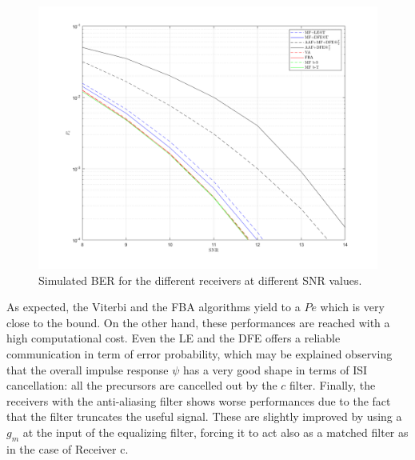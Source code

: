 \documentclass[a4paper, 12pt]{report}
\begin{document}
\begin{figure}[H]
	\centering
	\includegraphics[width=15cm]{images/PevsGamma}
	\caption{Simulated BER for the different receivers at different SNR values.}\label{Pe}
\end{figure}

As expected, the Viterbi and the FBA algorithms yield to a $Pe$ which is very close to the bound. On the other hand, these performances are reached with a high computational cost. Even the LE and the DFE offers a reliable communication in term of error probability, which may be explained observing that the overall impulse response $\psi$ has a very good shape in terms of ISI cancellation: all the precursors are cancelled out by the $c$ filter. Finally, the receivers with the anti-aliasing filter shows worse performances due to the fact that the filter truncates the useful signal. These are slightly improved by using a $g_m$ at the input of the equalizing filter, forcing it to act also as a matched filter as in the case of Receiver c.
\end{document}

